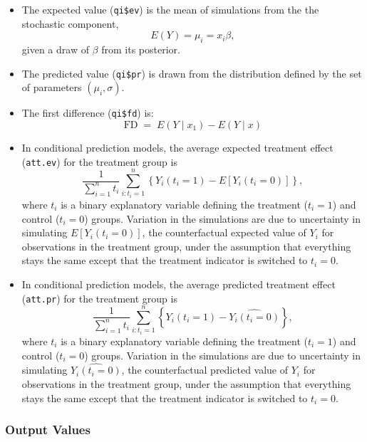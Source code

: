\documentclass{article}
\begin{document}
\begin{itemize}
\item The expected value ({\tt qi\$ev}) is the mean of simulations
  from the the stochastic component, $$E(Y) = \mu_i = x_i \beta,$$
  given a draw of $\beta$ from its posterior.  

\item The predicted value ({\tt qi\$pr}) is drawn from the distribution
  defined by the set of parameters $(\mu_i, \sigma)$.  

\item The first difference ({\tt qi\$fd}) is:
\begin{equation*}
\textrm{FD}\; = \;E(Y \mid x_1) -  E(Y \mid x)
\end{equation*}

\item In conditional prediction models, the average expected treatment
  effect ({\tt att.ev}) for the treatment group is 
    \begin{equation*} \frac{1}{\sum_{i=1}^n t_i}\sum_{i:t_i=1}^n \left\{ Y_i(t_i=1) -
      E[Y_i(t_i=0)] \right\},
    \end{equation*} 
    where $t_i$ is a binary explanatory variable defining the treatment
    ($t_i=1$) and control ($t_i=0$) groups.  Variation in the
    simulations are due to uncertainty in simulating $E[Y_i(t_i=0)]$,
    the counterfactual expected value of $Y_i$ for observations in the
    treatment group, under the assumption that everything stays the
    same except that the treatment indicator is switched to $t_i=0$.

\item In conditional prediction models, the average predicted treatment
  effect ({\tt att.pr}) for the treatment group is 
    \begin{equation*} \frac{1}{\sum_{i=1}^n t_i}\sum_{i:t_i=1}^n \left\{ Y_i(t_i=1) -
      \widehat{Y_i(t_i=0)} \right\},
    \end{equation*} 
    where $t_i$ is a binary explanatory variable defining the
    treatment ($t_i=1$) and control ($t_i=0$) groups.  Variation in
    the simulations are due to uncertainty in simulating
    $\widehat{Y_i(t_i=0)}$, the counterfactual predicted value of
    $Y_i$ for observations in the treatment group, under the
    assumption that everything stays the same except that the
    treatment indicator is switched to $t_i=0$.

\end{itemize}

\subsubsection{Output Values}
\end{document}
